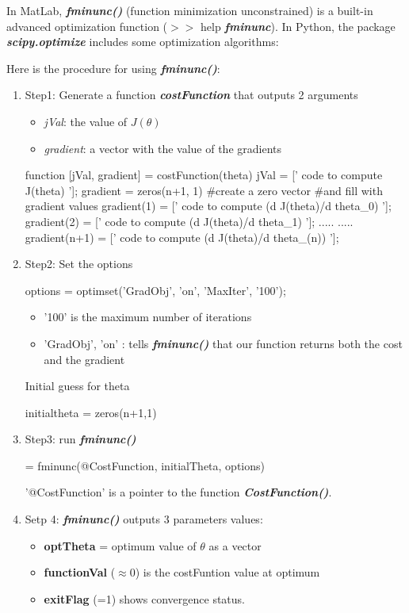 \documentclass[a4paper,12pt]{report}
\begin{document}
In MatLab, \textbf{\textit{fminunc()}} (function minimization unconstrained) is a built-in advanced optimization function ($>>$ help \textbf{\textit{fminunc}}). In Python, the package \textbf{\textit{scipy.optimize}} includes some optimization algorithms:


Here is the procedure for using \textit{\textbf{fminunc()}}:

\begin{enumerate}
	\item Step1: Generate a function \textit{\textbf{costFunction}} that outputs 2 arguments
			\begin{itemize}
				\item \textit{jVal}: the value of $J(\theta)$
				\item \textit{gradient}: a vector with the value of the gradients
			\end{itemize}
\begin{python}
function [jVal, gradient] = costFunction(theta)
	jVal = [' code to compute J(theta) ']; 
	gradient = zeros(n+1, 1) #create a zero vector 
	#and fill with gradient values 
	gradient(1) = [' code to compute (d J(theta)/d theta_0) ']; 
	gradient(2) = [' code to compute (d J(theta)/d theta_1)	'];
	.....
	.....
	gradient(n+1) = [' code to compute (d J(theta)/d theta_(n))	'];			
\end{python}

\item Step2: Set the options
\begin{python}
options = optimset('GradObj', 'on', 'MaxIter', '100');
\end{python}
\begin{itemize}
\item '100' is the maximum number of iterations
\item 'GradObj', 'on' : tells \textbf{\textit{fminunc()}} that our function returns both the cost and the gradient  
\end{itemize}
Initial guess for theta \\
\begin{python}
initialtheta = zeros(n+1,1)
\end{python}
\item Step3: run \textit{\textbf{fminunc()}}
\begin{python}
 = fminunc(@CostFunction, initialTheta, options)
\end{python}
'@CostFunction' is a pointer to the function \textbf{\textit{CostFunction()}}.
\item Setp 4: \textbf{\textit{fminunc()}} outputs 3 parameters values:
\begin{itemize}
\item \textbf{optTheta} = optimum value of $\theta$ as a vector
\item \textbf{functionVal} ($\approx 0$) is the costFuntion value at optimum
\item \textbf{exitFlag} (=1) shows convergence status. 
\end{itemize}
\end{enumerate}
\end{document}
